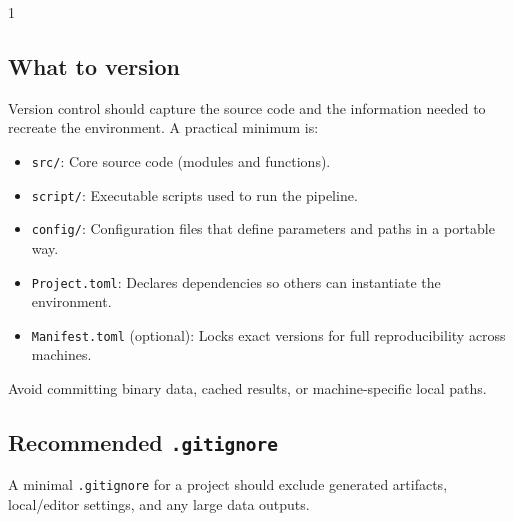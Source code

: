 \begin{multicols}{1}
\subsection{What to version}

Version control should capture the \Julia{} source code and the information needed to recreate the environment. A practical minimum is:

\end{multicols}

\begin{tcolorbox}[
  enhanced,
  breakable,
  colback=black!1,
  colframe=black!40,
  boxrule=0.5pt,
  arc=1.5mm,
  title=\textbf{What to commit}
]
\footnotesize
\begin{itemize}[leftmargin=*,itemsep=2pt,topsep=2pt]
\item \texttt{src/}: Core source code (modules and functions).
\item \texttt{script/}: Executable scripts used to run the pipeline.
\item \texttt{config/}: Configuration files that define parameters and paths in a portable way.
\item \texttt{Project.toml}: Declares dependencies so others can instantiate the environment.
\item \texttt{Manifest.toml} (optional): Locks exact versions for full reproducibility across machines.
\end{itemize}
\end{tcolorbox}

Avoid committing binary data, cached results, or machine-specific local paths.

\subsection{Recommended \texttt{.gitignore}}

A minimal \texttt{.gitignore} for a \Julia{} project should exclude generated artifacts, local/editor settings, and any large data outputs.

